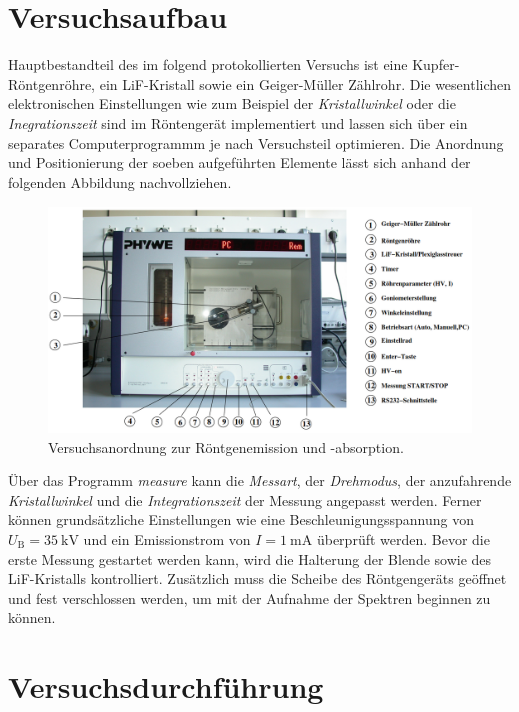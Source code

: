 


\section{Versuchsaufbau}
\label{sec:Versuchsaufbau}

Hauptbestandteil des im folgend protokollierten Versuchs ist eine Kupfer-Röntgenröhre, ein LiF-Kristall sowie ein Geiger-Müller Zählrohr. Die wesentlichen 
elektronischen Einstellungen wie zum Beispiel der \emph{Kristallwinkel} oder die \emph{Inegrationszeit} sind im Röntengerät implementiert und lassen 
sich über ein separates Computerprogrammm je nach Versuchsteil optimieren. Die Anordnung und Positionierung der soeben aufgeführten Elemente lässt sich 
anhand der folgenden Abbildung nachvollziehen.

\begin{figure}[H]
    \centering
    \includegraphics[height=6cm]{Aufbau.png}
    \caption{Versuchsanordnung zur Röntgenemission und -absorption\cite{Versuchsanleitung_v602}.}
    \label{fig:Aufbau}
\end{figure}

\noindent Über das Programm \emph{measure} kann die \emph{Messart}, der \emph{Drehmodus}, der anzufahrende \emph{Kristallwinkel} und die \emph{Integrationszeit}
der Messung angepasst werden. Ferner können grundsätzliche Einstellungen wie eine Beschleunigungsspannung von $U_\text{B} = \qty{35}{\kilo\volt}$ und ein Emissionstrom 
von $I = \qty{1}{\milli\ampere}$ überprüft werden. Bevor die erste Messung  gestartet werden kann, wird die Halterung der Blende sowie des LiF-Kristalls kontrolliert. 
Zusätzlich muss die Scheibe des Röntgengeräts geöffnet und fest verschlossen werden, um mit der Aufnahme der Spektren beginnen zu können. 

\section{Versuchsdurchführung}
\label{sec:Versuchsdurchfuehrung}

